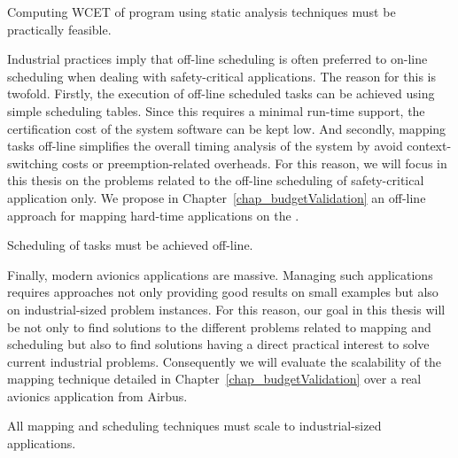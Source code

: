 \documentclass[main.tex]{subfiles}
\begin{document}
\begin{constraint}
    \label{constr_staticAnalysis}
    Computing WCET of program using static analysis techniques must be practically feasible.
\end{constraint}




Industrial practices imply that off-line scheduling is often preferred to on-line scheduling when dealing with safety-critical applications. The reason for this is twofold. Firstly, the execution of off-line scheduled tasks can be achieved using simple scheduling tables. Since this requires a minimal run-time support, the certification cost of the system software can be kept low. And secondly, mapping tasks off-line simplifies the overall timing analysis of the system by avoid context-switching costs or preemption-related overheads. For this reason, we will focus in this thesis on the problems related to the off-line scheduling of safety-critical application only. We propose in Chapter~\ref{chap_budgetValidation} an off-line approach for mapping hard-time applications on the \mppalong.

\begin{constraint}
    \label{constr_schedOffLine}
    Scheduling of tasks must be achieved off-line.
\end{constraint}

Finally, modern avionics applications are massive. Managing such applications requires approaches not only providing good results on small examples but also on industrial-sized problem instances. For this reason, our goal in this thesis will be not only to find solutions to the different problems related to mapping and scheduling but also to find solutions having a direct practical interest to solve current industrial problems. Consequently we will evaluate the scalability of the mapping technique detailed in Chapter~\ref{chap_budgetValidation} over a real avionics application from Airbus.

\begin{constraint}
    \label{constr_scalability}
    All mapping and scheduling techniques must scale to industrial-sized applications.
\end{constraint}

\end{document}
